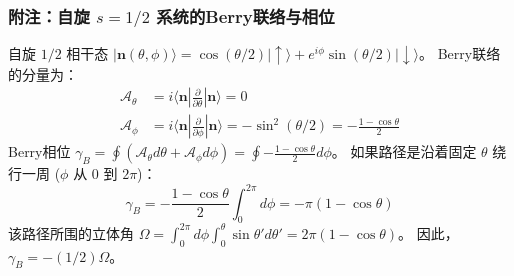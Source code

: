 \documentclass[12pt, a4paper]{article}
\newcommand{\ket}[1]{| #1 \rangle}
\newcommand{\bra}[1]{\langle #1 |}
\newcommand{\nvec}{\mathbf{n}}
\begin{document}
\subsubsection*{附注：自旋 \(s=1/2\) 系统的Berry联络与相位}
自旋 \(1/2\) 相干态 \(\ket{\nvec(\theta, \phi)} = \cos(\theta/2) \ket{\uparrow} + e^{i\phi} \sin(\theta/2) \ket{\downarrow}\)。
Berry联络的分量为：
\begin{align*}
\mathcal{A}_\theta &= i \bra{\nvec} \frac{\partial}{\partial\theta} \ket{\nvec} = 0 \\
\mathcal{A}_\phi &= i \bra{\nvec} \frac{\partial}{\partial\phi} \ket{\nvec} = -\sin^2(\theta/2) = -\frac{1-\cos\theta}{2}
\end{align*}
Berry相位 \(\gamma_B = \oint (\mathcal{A}_\theta d\theta + \mathcal{A}_\phi d\phi) = \oint -\frac{1-\cos\theta}{2} d\phi\)。
如果路径是沿着固定 \(\theta\) 绕行一周 (\(\phi\) 从 0 到 \(2\pi\))：
\[ \gamma_B = -\frac{1-\cos\theta}{2} \int_0^{2\pi} d\phi = -\pi(1-\cos\theta) \]
该路径所围的立体角 \(\Omega = \int_0^{2\pi} d\phi \int_0^\theta \sin\theta' d\theta' = 2\pi (1-\cos\theta)\)。
因此，\(\gamma_B = -(1/2)\Omega\)。
\end{document}
